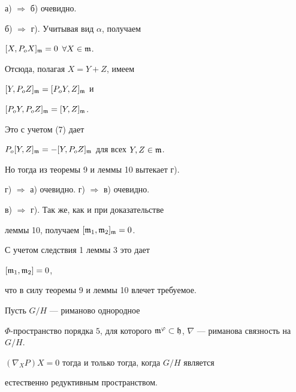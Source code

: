 \begin{pf}


а) $\Longrightarrow$ б) очевидно.





б) $\Longrightarrow$ г). Учитывая вид $\alpha$, получаем


$[X,P_oX]_{\frak{m}}=0$ $\forall X \in \frak{m}$.


Отсюда, полагая $X=Y+Z$, имеем


$[Y,P_oZ]_{\frak{m}}=[P_oY,Z]_{\frak{m}}$ и


$[P_oY,P_oZ]_{\frak{m}}=[Y,Z]_{\frak{m}}$.


Это с учетом (7) дает


$P_o[Y,Z]_{\frak{m}}=-[Y,P_oZ]_{\frak{m}}$ для всех $Y,Z \in\frak{m}$.


Но тогда из теоремы 9 и леммы 10 вытекает г).





г) $\Longrightarrow$ а) очевидно. г) $\Longrightarrow$ в) очевидно.





в) $\Longrightarrow$ г). Так же, как и при доказательстве 


леммы 10, получаем $[\frak{m}_1,\frak{m}_2]_{\frak{m}}=0$.


С учетом следствия 1 леммы 3 это дает


$[\frak{m}_1,\frak{m}_2]=0$,


что в силу теоремы 9 и леммы 10 влечет требуемое.


\end{pf}





\begin{lem}


Пусть $G/H$ --- риманово однородное


$\Phi$-пространство порядка $5$, для которого $\frak{m}^\varphi


\subset \frak{h}$, $\nabla$ --- риманова связность на $G/H$.


$(\nabla_XP)X=0$ тогда и только тогда, когда $G/H$ является


естественно редуктивным пространством.


\end{lem}





